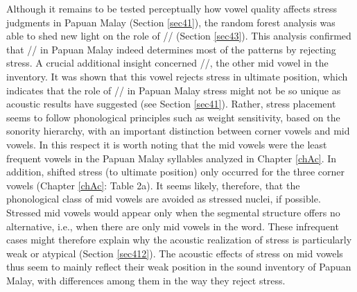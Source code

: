 Although it remains to be tested perceptually how vowel quality affects stress judgments in Papuan Malay (Section \ref{sec41}), the random forest analysis was able to shed new light on the role of // (Section \ref{sec43}). This analysis confirmed that // in Papuan Malay indeed determines most of the patterns by rejecting stress. A crucial additional insight concerned //, the other mid vowel in the inventory. It was shown that this vowel rejects stress in ultimate position, which indicates that the role of // in Papuan Malay stress might not be so unique as acoustic results have suggested (see Section \ref{sec41}). Rather, stress placement seems to follow phonological principles such as weight sensitivity, based on the sonority hierarchy, with an important distinction between corner vowels and mid vowels. In this respect it is worth noting that the mid vowels were the least frequent vowels in the Papuan Malay syllables analyzed in Chapter \ref{chAc}. In addition, shifted stress (to ultimate position) only occurred for the three corner vowels (Chapter \ref{chAc}: Table 2a). It seems likely, therefore, that the phonological class of mid vowels are avoided as stressed nuclei, if possible. Stressed mid vowels would appear only when the segmental structure offers no alternative, i.e., when there are only mid vowels in the word. These infrequent cases might therefore explain why the acoustic realization of stress is particularly weak or atypical (Section \ref{sec412}). The acoustic effects of stress on mid vowels thus seem to mainly reflect their weak position in the sound inventory of Papuan Malay, with differences among them in the way they reject stress.\par

